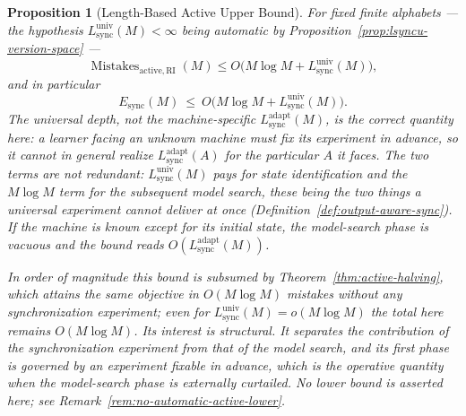 \documentclass[12pt]{article}
\newtheorem{proposition}[theorem]{Proposition}
\theoremstyle{definition}
\newcommand{\Lsync}{L_{\mathrm{sync}}^{\mathrm{adapt}}}
\newcommand{\Lsyncu}{L_{\mathrm{sync}}^{\mathrm{univ}}}
\newcommand{\Esync}{E_{\mathrm{sync}}}
\newcommand{\MistRI}{\operatorname{Mistakes}_{\mathrm{active,RI}}}
\begin{document}
\begin{proposition}[Length-Based Active Upper Bound]
\label{prop:active-length-upper}
For fixed finite alphabets --- the hypothesis $\Lsyncu(M)<\infty$ being
automatic by Proposition~\ref{prop:lsyncu-version-space} ---
\[
\MistRI(M)
\le
O\bigl(M\log M+\Lsyncu(M)\bigr),
\]
and in particular
\[
\Esync(M)\ \le\ O\bigl(M\log M+\Lsyncu(M)\bigr).
\]
The universal depth, not the machine-specific $\Lsync(M)$, is the correct
quantity here: a learner facing an unknown machine must fix its experiment in
advance, so it cannot in general realize $L_{\mathrm{sync}}^{\mathrm{adapt}}(A)$
for the particular $A$ it faces.  The two terms are not redundant: $\Lsyncu(M)$
pays for state identification and the $M\log M$ term for the subsequent model
search, these being the two things a universal experiment cannot deliver at
once (Definition~\ref{def:output-aware-sync}).  If the machine is known except
for its initial state, the model-search phase is vacuous and the bound reads
$O(\Lsync(M))$.

In order of magnitude this bound is subsumed by
Theorem~\ref{thm:active-halving}, which attains the same objective in
$O(M\log M)$ mistakes without any synchronization experiment; even for
$\Lsyncu(M)=o(M\log M)$ the total here remains $O(M\log M)$.  Its interest is
structural.  It separates the contribution of the synchronization experiment
from that of the model search, and its first phase is governed by an experiment
fixable in advance, which is the operative quantity when the model-search phase
is externally curtailed.
No lower bound is asserted here; see
Remark~\ref{rem:no-automatic-active-lower}.
\end{proposition}
\end{document}

